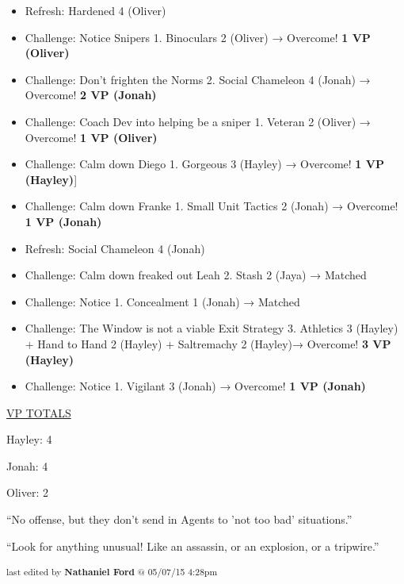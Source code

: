 \begin{itemize}
\item Refresh: Hardened 4 (Oliver)
\item Challenge: Notice Snipers 1. Binoculars 2 (Oliver) → Overcome! \textbf{1 VP (Oliver)}
\item Challenge: Don't frighten the Norms 2.  Social Chameleon 4 (Jonah) → Overcome! \textbf{2 VP (Jonah)}
\item Challenge: Coach Dev into helping be a sniper 1. Veteran 2 (Oliver) → Overcome! \textbf{1 VP (Oliver)}
\item Challenge: Calm down Diego 1. Gorgeous 3 (Hayley) → Overcome! \textbf{1 VP (Hayley)}{]} 
\item Challenge: Calm down Franke 1. Small Unit Tactics 2 (Jonah) → Overcome! \textbf{1 VP (Jonah)}
\item Refresh: Social Chameleon 4 (Jonah)
\item Challenge: Calm down freaked out Leah 2. Stash 2 (Jaya) →  Matched
\item Challenge: Notice 1. Concealment 1 (Jonah) → Matched
\item Challenge: The Window is not a viable Exit Strategy 3. Athletics 3 (Hayley) + Hand to Hand 2 (Hayley) + Saltremachy 2 (Hayley)→ Overcome! \textbf{3 VP (Hayley)}
\item Challenge: Notice 1. Vigilant 3 (Jonah)  → Overcome! \textbf{1 VP (Jonah)}
\end{itemize}





\underline{  {\LARGE VP TOTALS }  }

Hayley: 4

Jonah: 4

Oliver: 2



``No offense, but they don't send in Agents to 'not too bad' situations.''




``Look for anything unusual!  Like an assassin, or an explosion, or a tripwire.'' 



\vspace{\fill}

\begin{flushright}
\textsubscript{last edited by \textbf{Nathaniel Ford} @ 05/07/15 4:28pm}
\end{flushright}

